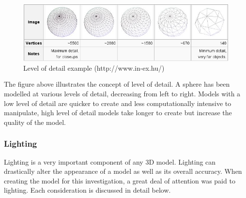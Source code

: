 \documentclass[11pt,a4paper]{report}
\begin{document}
			\begin{figure}[H]
				\centering
				\includegraphics[width=1\textwidth]{level_of_detail_example}
				\caption{Level of detail example (http://www.in-ex.hu/)}
			\end{figure}
			
			The figure above illustrates the concept of level of detail. A sphere has been modelled at various levels of detail, decreasing from left to right. Models with a low level of detail are quicker to create and less computationally intensive to manipulate, high level of detail models take longer to create but increase the quality of the model.
				
			\subsubsection{Lighting}
				Lighting is a very important component of any 3D model. Lighting can drastically alter the appearance of a model as well as its overall accuracy. When creating the model for this investigation, a great deal of attention was paid to lighting. Each consideration is discussed in detail below.
				
\end{document}
